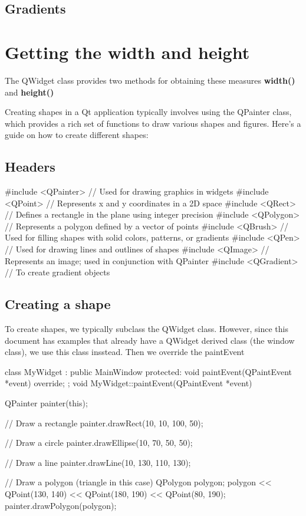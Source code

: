 \documentclass{report}
\begin{document}
    \bigbreak \noindent 
    \subsection{Gradients}

    \bigbreak \noindent 
    \section*{Getting the width and height}
    The QWidget class provides two methods for obtaining these measures \textbf{width()} and \textbf{height()}

    \bigbreak \noindent 
    \bigbreak \noindent 
    Creating shapes in a Qt application typically involves using the QPainter class, which provides a rich set of functions to draw various shapes and figures. Here's a guide on how to create different shapes:
    \pagebreak 
    \subsection{Headers}
    \bigbreak \noindent 
    \begin{cppcode}
        #include <QPainter>      // Used for drawing graphics in widgets
        #include <QPoint>        // Represents x and y coordinates in a 2D space
        #include <QRect>         // Defines a rectangle in the plane using integer precision
        #include <QPolygon>      // Represents a polygon defined by a vector of points
        #include <QBrush>        // Used for filling shapes with solid colors, patterns, or gradients
        #include <QPen>          // Used for drawing lines and outlines of shapes
        #include <QImage>        // Represents an image; used in conjunction with QPainter
        #include <QGradient>     // To create gradient objects
    \end{cppcode}
    \bigbreak \noindent 
    \subsection{Creating a shape}
    \bigbreak \noindent 
    To create shapes, we typically  subclass the QWidget class. However, since this document has examples that already have a QWidget derived class (the window class), we use this class insstead. Then we override the paintEvent
    \bigbreak \noindent 
    \begin{cppcode}
class MyWidget : public MainWindow {
protected:
    void paintEvent(QPaintEvent *event) override;
};
void MyWidget::paintEvent(QPaintEvent *event) {
    QPainter painter(this);

    // Draw a rectangle
    painter.drawRect(10, 10, 100, 50);

    // Draw a circle
    painter.drawEllipse(10, 70, 50, 50);

    // Draw a line
    painter.drawLine(10, 130, 110, 130);

    // Draw a polygon (triangle in this case)
    QPolygon polygon;
    polygon << QPoint(130, 140) << QPoint(180, 190) << QPoint(80, 190);
    painter.drawPolygon(polygon);
}
    \end{cppcode}
\end{document}
